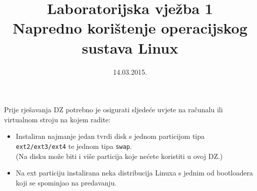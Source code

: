 \documentclass[12pt,a4paper]{article}
\begin{document}
	\title{Laboratorijska vježba 1\\{\large Napredno korištenje operacijskog sustava Linux}}
	\date{\vspace{-5ex} 14.03.2015.}
   \maketitle
    Prije rješavanja DZ potrebno je osigurati sljedeće uvjete na računalu ili virtualnom stroju na kojem radite:
    
    \begin{itemize}
        \item Instaliran najmanje jedan tvrdi disk s jednom particijom tipa \texttt{ext2/ext3/ext4} te jednom tipa \texttt{swap}.\\ {\small (Na disku može biti i više  particija koje nećete koristiti u ovoj DZ.)}
        \item Na ext particiju instalirana neka distribucija Linuxa s jednim od bootloadera koji se spominjao na predavanju.
    \end{itemize}
\end{document}
